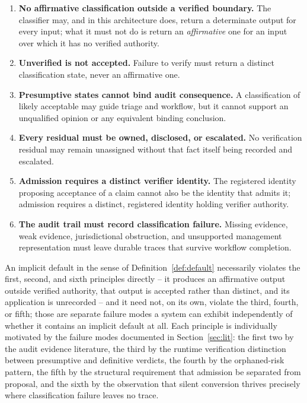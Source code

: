 \documentclass[11pt,a4paper]{article}
\theoremstyle{definition}
\theoremstyle{remark}
\begin{document}
\begin{enumerate}
\item \textbf{No affirmative classification outside a verified boundary.} The classifier may, and in this architecture does, return a determinate output for every input; what it must not do is return an \emph{affirmative} one for an input over which it has no verified authority.
\item \textbf{Unverified is not accepted.} Failure to verify must return a distinct classification state, never an affirmative one.
\item \textbf{Presumptive states cannot bind audit consequence.} A classification of likely acceptable may guide triage and workflow, but it cannot support an unqualified opinion or any equivalent binding conclusion.
\item \textbf{Every residual must be owned, disclosed, or escalated.} No verification residual may remain unassigned without that fact itself being recorded and escalated.
\item \textbf{Admission requires a distinct verifier identity.} The registered identity proposing acceptance of a claim cannot also be the identity that admits it; admission requires a distinct, registered identity holding verifier authority.
\item \textbf{The audit trail must record classification failure.} Missing evidence, weak evidence, jurisdictional obstruction, and unsupported management representation must leave durable traces that survive workflow completion.
\end{enumerate}

An implicit default in the sense of Definition~\ref{def:default} necessarily violates the first, second, and sixth principles directly -- it produces an affirmative output outside verified authority, that output is accepted rather than distinct, and its application is unrecorded -- and it need not, on its own, violate the third, fourth, or fifth; those are separate failure modes a system can exhibit independently of whether it contains an implicit default at all. Each principle is individually motivated by the failure modes documented in Section~\ref{sec:lit}: the first two by the audit evidence literature, the third by the runtime verification distinction between presumptive and definitive verdicts, the fourth by the orphaned-risk pattern, the fifth by the structural requirement that admission be separated from proposal, and the sixth by the observation that silent conversion thrives precisely where classification failure leaves no trace.
\end{document}
